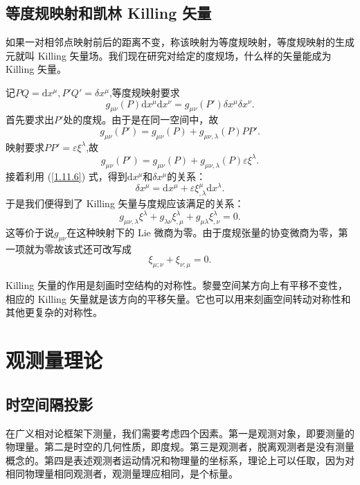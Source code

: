 \documentclass[11pt, a4paper, oneside, onecolumn]{ctexart}
\numberwithin{equation}{subsection}
\begin{document}
\subsection{等度规映射和凯林 Killing 矢量}
如果一对相邻点映射前后的距离不变，称该映射为等度规映射，等度规映射的生成元就叫 Killing 矢量场。我们现在研究对给定的度规场，什么样的矢量能成为 Killing 矢量。

记$PQ=\mathrm{d}x^{\mu},P'Q'=\delta{}x^{\mu}$,等度规映射要求
\begin{equation}
g_{\mu\nu}\left(P\right)\mathrm{d}x^{\mu}\mathrm{d}x^{\nu}=g_{\mu\nu}\left(P'\right)\delta{}x^{\mu}\delta{}x^{\nu}.
\end{equation}
首先要求出$P'$处的度规。由于是在同一空间中，故
\begin{equation}
g_{\mu\nu}\left(P'\right)=g_{\mu\nu}\left(P\right)+g_{\mu\nu,\lambda}\left(P\right)PP'.
\end{equation}
映射要求$PP'=\varepsilon\xi^{\lambda}$,故
\begin{equation}
g_{\mu\nu}\left(P'\right)=g_{\mu\nu}\left(P\right)+g_{\mu\nu,\lambda}\left(P\right)\varepsilon\xi^{\lambda}.
\end{equation}
接着利用 (\ref{1.11.6}) 式，得到$\mathrm{d}x^{\mu}$和$\delta{}x^{\mu}$的关系：
\begin{equation}
\delta{}x^{\mu}=\mathrm{d}x^{\mu}+\varepsilon\xi^{\mu}_{,\lambda}\mathrm{d}x^{\lambda}.
\end{equation}
于是我们便得到了 Killing 矢量与度规应该满足的关系：
\begin{equation}
g_{\mu\nu,\lambda}\xi^{\lambda}+g_{\lambda\nu}\xi^{\lambda}_{,\mu}+g_{\mu\lambda}\xi^{\lambda}_{,\nu}=0.
\end{equation}
这等价于说$g_{\mu\nu}$在这种映射下的 Lie 微商为零。由于度规张量的协变微商为零，第一项就为零故该式还可改写成
\begin{equation}
\xi_{\mu;\nu}+\xi_{\nu;\mu}=0.\label{1.12.6}
\end{equation}

Killing 矢量的作用是刻画时空结构的对称性。黎曼空间某方向上有平移不变性，相应的 Killing 矢量就是该方向的平移矢量。它也可以用来刻画空间转动对称性和其他更复杂的对称性。

\newpage
\section{观测量理论}
\subsection{时空间隔投影}
在广义相对论框架下测量，我们需要考虑四个因素。第一是观测对象，即要测量的物理量。第二是时空的几何性质，即度规。第三是观测者，脱离观测者是没有测量概念的。第四是表述观测者运动情况和物理量的坐标系，理论上可以任取，因为对相同物理量相同观测者，观测量理应相同，是个标量。
\end{document}
